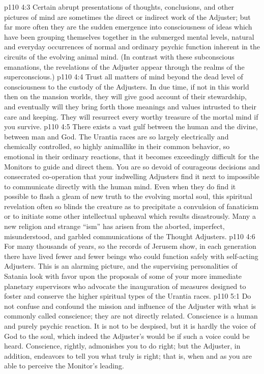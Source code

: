 \vs p110 4:3 Certain abrupt presentations of thoughts, conclusions, and other pictures of mind are sometimes the direct or indirect work of the Adjuster; but far more often they are the sudden emergence into consciousness of ideas which have been grouping themselves together in the submerged mental levels, natural and everyday occurrences of normal and ordinary psychic function inherent in the circuits of the evolving animal mind. (In contrast with these subconscious emanations, the revelations of the Adjuster appear through the realms of the superconscious.)
\vs p110 4:4 Trust all matters of mind beyond the dead level of consciousness to the custody of the Adjusters. In due time, if not in this world then on the mansion worlds, they will give good account of their stewardship, and eventually will they bring forth those meanings and values intrusted to their care and keeping. They will resurrect every worthy treasure of the mortal mind if you survive.
\pc \vs p110 4:5 There exists a vast gulf between the human and the divine, between man and God. The Urantia races are so largely electrically and chemically controlled, so highly animallike in their common behavior, so emotional in their ordinary reactions, that it becomes exceedingly difficult for the Monitors to guide and direct them. You are so devoid of courageous decisions and consecrated co\hyp{}operation that your indwelling Adjusters find it next to impossible to communicate directly with the human mind. Even when they do find it possible to flash a gleam of new truth to the evolving mortal soul, this spiritual revelation often so blinds the creature as to precipitate a convulsion of fanaticism or to initiate some other intellectual upheaval which results disastrously. Many a new religion and strange “ism” has arisen from the aborted, imperfect, misunderstood, and garbled communications of the Thought Adjusters.
\vs p110 4:6 For many thousands of years, so the records of Jerusem show, in each generation there have lived fewer and fewer beings who could function safely with self\hyp{}acting Adjusters. This is an alarming picture, and the supervising personalities of Satania look with favor upon the proposals of some of your more immediate planetary supervisors who advocate the inauguration of measures designed to foster and conserve the higher spiritual types of the Urantia races.
\vs p110 5:1 Do not confuse and confound the mission and influence of the Adjuster with what is commonly called conscience; they are not directly related. Conscience is a human and purely psychic reaction. It is not to be despised, but it is hardly the voice of God to the soul, which indeed the Adjuster’s would be if such a voice could be heard. Conscience, rightly, admonishes you to do right; but the Adjuster, in addition, endeavors to tell you what truly is right; that is, when and as you are able to perceive the Monitor’s leading.
